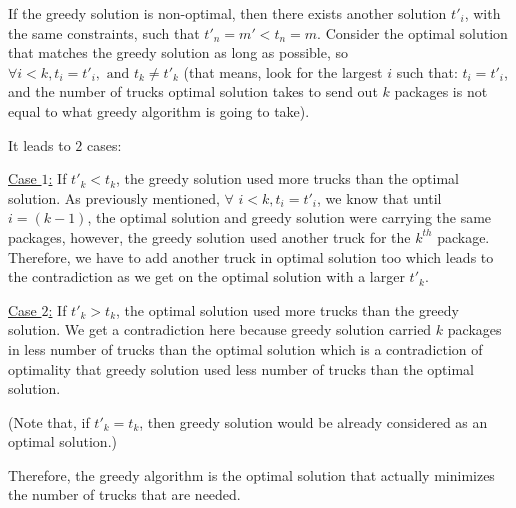 \documentclass[letterpaper,11pt]{article}
\begin{document}
If the greedy solution is non-optimal, then there exists another solution $t'_{i}$, with the same constraints, such that $t'_n = m' < t_n = m$.
Consider the optimal solution that matches the greedy solution as long as possible, so $\forall i < k, t_i = t'_i, \text{ and } t_k \neq t'_k$ (that means, look for the largest $i$ such that: $t_i = t'_i$, and the number of trucks optimal solution takes to send out $k$ packages is not equal to what greedy algorithm is going to take).

It leads to $2$ cases:

\underline{Case $1$:} If $t'_k < t_k$, the greedy solution used more trucks than the optimal solution. As previously mentioned, $\forall$ $i < k, t_i = t'_i$, we know that until $i = (k-1)$, the optimal solution and greedy solution were carrying the same packages, however, the greedy solution used another truck for the $k^{th}$ package. Therefore, we have to add another truck in optimal solution too which leads to the contradiction as we get on the optimal solution with a larger $t'_k$.

\underline{Case $2$:} If $t'_k > t_k$, the optimal solution used more trucks than the greedy solution. We get a contradiction here because greedy solution carried $k$ packages in less number of trucks than the optimal solution which is a contradiction of optimality that greedy solution used less number of trucks than the optimal solution.

(Note that, if $t'_k = t_k$, then greedy solution would be already considered as an optimal solution.)

Therefore, the greedy algorithm is the optimal solution that actually minimizes the number of trucks that are needed.
\end{document}
